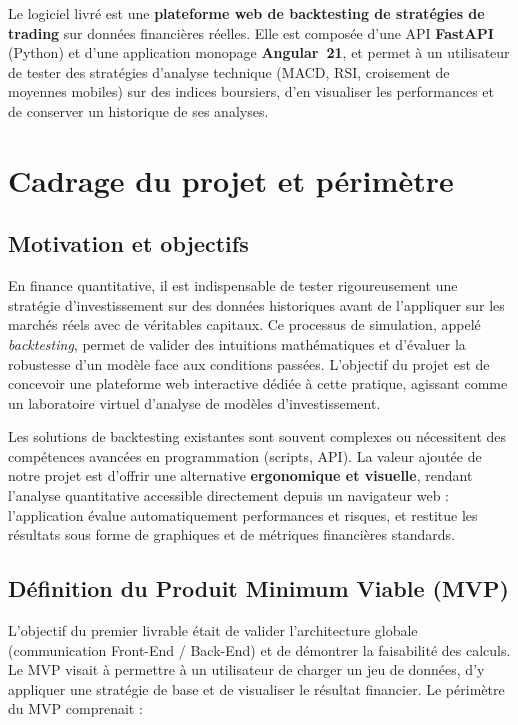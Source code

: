 \documentclass[11pt,a4paper]{article}
\begin{document}
\medskip
Le logiciel livré est une \textbf{plateforme web de backtesting de stratégies de
trading} sur données financières réelles. Elle est composée d'une API
\textbf{FastAPI} (Python) et d'une application monopage \textbf{Angular~21}, et
permet à un utilisateur de tester des stratégies d'analyse technique (MACD, RSI,
croisement de moyennes mobiles) sur des indices boursiers, d'en visualiser les
performances et de conserver un historique de ses analyses.

\section{Cadrage du projet et périmètre}
\subsection{Motivation et objectifs}
En finance quantitative, il est indispensable de tester rigoureusement une
stratégie d'investissement sur des données historiques avant de l'appliquer sur
les marchés réels avec de véritables capitaux. Ce processus de simulation,
appelé \emph{backtesting}, permet de valider des intuitions mathématiques et
d'évaluer la robustesse d'un modèle face aux conditions passées. L'objectif du
projet est de concevoir une plateforme web interactive dédiée à cette pratique,
agissant comme un laboratoire virtuel d'analyse de modèles d'investissement.

\medskip
Les solutions de backtesting existantes sont souvent complexes ou nécessitent des
compétences avancées en programmation (scripts, API). La valeur ajoutée de notre
projet est d'offrir une alternative \textbf{ergonomique et visuelle}, rendant
l'analyse quantitative accessible directement depuis un navigateur web :
l'application évalue automatiquement performances et risques, et restitue les
résultats sous forme de graphiques et de métriques financières standards.

\subsection{Définition du Produit Minimum Viable (MVP)}
L'objectif du premier livrable était de valider l'architecture globale
(communication Front-End / Back-End) et de démontrer la faisabilité des calculs.
Le MVP visait à permettre à un utilisateur de charger un jeu de données, d'y
appliquer une stratégie de base et de visualiser le résultat financier. Le
périmètre du MVP comprenait :
\end{document}
